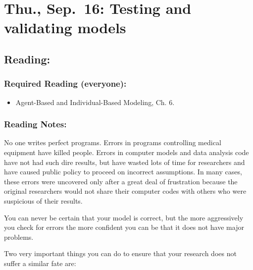 \documentclass[
]{article}
\providecommand{\tightlist}{%
  \setlength{\itemsep}{0pt}\setlength{\parskip}{0pt}}
\begin{document}
\hypertarget{thu.-sep.-16-testing-and-validating-models}{%
\section{Thu., Sep.~16: Testing and validating
models}\label{thu.-sep.-16-testing-and-validating-models}}

\hypertarget{reading-6}{%
\subsection{Reading:}\label{reading-6}}

\hypertarget{required-reading-everyone-5}{%
\subsubsection{Required Reading
(everyone):}\label{required-reading-everyone-5}}

\begin{itemize}
\tightlist
\item
  Agent-Based and Individual-Based Modeling, Ch. 6.
\end{itemize}

\hypertarget{reading-notes-5}{%
\subsubsection{Reading Notes:}\label{reading-notes-5}}

No one writes perfect programs. Errors in programs controlling medical
equipment have killed people. Errors in computer models and data
analysis code have not had such dire results, but have wasted lots of
time for researchers and have caused public policy to proceed on
incorrect assumptions. In many cases, these errors were uncovered only
after a great deal of frustration because the original researchers would
not share their computer codes with others who were suspicious of their
results.

You can never be certain that your model is correct, but the more
aggressively you check for errors the more confident you can be that it
does not have major problems.

Two very important things you can do to ensure that your research does
not suffer a similar fate are:
\end{document}
